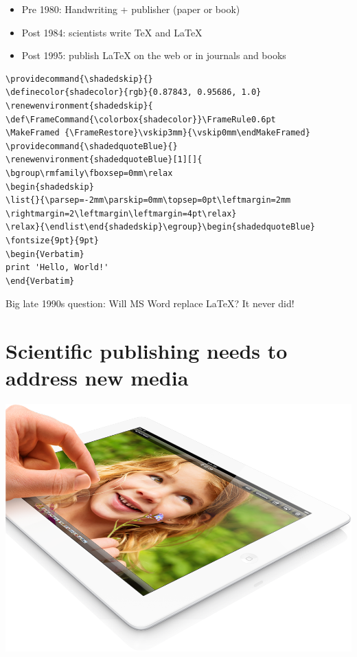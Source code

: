 \documentclass[%
twoside,                 %
final,                   %
chapterprefix=true,      %
open=right               %
10pt]{book}
\begin{document}
\begin{itemize}
 \item Pre 1980: Handwriting + publisher (paper or book)

 \item Post 1984: scientists write TeX and {\LaTeX}

 \item Post 1995: publish {\LaTeX} on the web or in journals and books
\end{itemize}

\noindent
\begin{verbatim}
\providecommand{\shadedskip}{}
\definecolor{shadecolor}{rgb}{0.87843, 0.95686, 1.0}
\renewenvironment{shadedskip}{
\def\FrameCommand{\colorbox{shadecolor}}\FrameRule0.6pt
\MakeFramed {\FrameRestore}\vskip3mm}{\vskip0mm\endMakeFramed}
\providecommand{\shadedquoteBlue}{}
\renewenvironment{shadedquoteBlue}[1][]{
\bgroup\rmfamily\fboxsep=0mm\relax
\begin{shadedskip}
\list{}{\parsep=-2mm\parskip=0mm\topsep=0pt\leftmargin=2mm
\rightmargin=2\leftmargin\leftmargin=4pt\relax}
\relax}{\endlist\end{shadedskip}\egroup}\begin{shadedquoteBlue}
\fontsize{9pt}{9pt}
\begin{Verbatim}
print 'Hello, World!'
\end{Verbatim}
\end{verbatim}

Big late 1990s question: Will MS Word replace {\LaTeX}? It never did!

\section*{Scientific publishing needs to address new media}


\begin{center}  %
  \centerline{\includegraphics[width=0.8\linewidth]{fig/ipad.png}}
\end{center}
\end{document}
